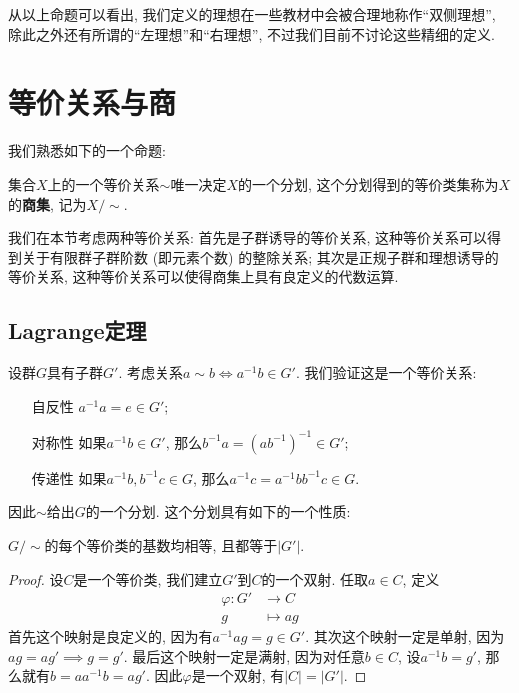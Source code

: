 \begin{rem}
    从以上命题可以看出, 我们定义的理想在一些教材中会被合理地称作``双侧理想'', 除此之外还有所谓的``左理想''和``右理想'', 不过我们目前不讨论这些精细的定义.
\end{rem}

\section{等价关系与商}

我们熟悉如下的一个命题:
\begin{prop}
    集合$X$上的一个等价关系$\sim$唯一决定$X$的一个分划, 这个分划得到的等价类集称为$X$的{\bf 商集}, 记为$X/\sim$.
\end{prop}

我们在本节考虑两种等价关系:
首先是子群诱导的等价关系, 这种等价关系可以得到关于有限群子群阶数 (即元素个数) 的整除关系;
其次是正规子群和理想诱导的等价关系, 这种等价关系可以使得商集上具有良定义的代数运算.

\subsection{Lagrange定理}

设群$G$具有子群$G'$.
考虑关系$a\sim b\iff a^{-1}b\in G'$.
我们验证这是一个等价关系:
\begin{itemize}
    \item[自反性] $a^{-1}a=e\in G'$;
    \item[对称性] 如果$a^{-1}b\in G'$, 那么$b^{-1}a=(ab^{-1})^{-1}\in G'$;
    \item[传递性] 如果$a^{-1}b,b^{-1}c\in G$, 那么$a^{-1}c=a^{-1}bb^{-1}c\in G$.
\end{itemize}
因此$\sim$给出$G$的一个分划.
这个分划具有如下的一个性质:

\begin{prop}\label{cardinal of coset}
    $G/\sim$的每个等价类的基数均相等, 且都等于$|G'|$.
\end{prop}
\begin{proof}
    设$C$是一个等价类, 我们建立$G'$到$C$的一个双射.
    任取$a\in C$, 定义
    \begin{align*}
        \varphi:G'&\to C\\
        g&\mapsto ag
    \end{align*}
    首先这个映射是良定义的, 因为有$a^{-1}ag=g\in G'$.
    其次这个映射一定是单射, 因为$ag=ag'\implies g=g'$.
    最后这个映射一定是满射, 因为对任意$b\in C$, 设$a^{-1}b=g'$, 那么就有$b=aa^{-1}b=ag'$.
    因此$\varphi$是一个双射, 有$|C|=|G'|$.
\end{proof}

